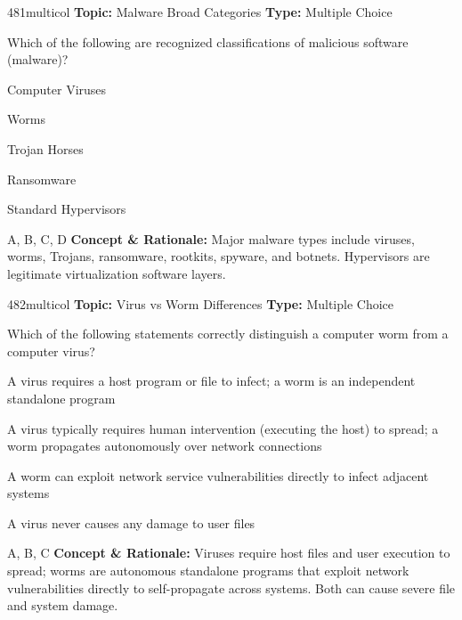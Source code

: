 \begin{qcard}{481}{multicol}
\textcolor{darkslate!75}{\small\textbf{Topic:} Malware Broad Categories \hfill \textbf{Type:} Multiple Choice}\vspace{0.4em}\par
Which of the following are recognized classifications of malicious software (malware)?
\begin{qoptions}
\item Computer Viruses
\item Worms
\item Trojan Horses
\item Ransomware
\item Standard Hypervisors
\end{qoptions}
\end{qcard}
\nopagebreak
\begin{explainbox}{A, B, C, D}
\textbf{Concept \& Rationale:} Major malware types include viruses, worms, Trojans, ransomware, rootkits, spyware, and botnets. Hypervisors are legitimate virtualization software layers.
\end{explainbox}

\begin{qcard}{482}{multicol}
\textcolor{darkslate!75}{\small\textbf{Topic:} Virus vs Worm Differences \hfill \textbf{Type:} Multiple Choice}\vspace{0.4em}\par
Which of the following statements correctly distinguish a computer worm from a computer virus?
\begin{qoptions}
\item A virus requires a host program or file to infect; a worm is an independent standalone program
\item A virus typically requires human intervention (executing the host) to spread; a worm propagates autonomously over network connections
\item A worm can exploit network service vulnerabilities directly to infect adjacent systems
\item A virus never causes any damage to user files
\end{qoptions}
\end{qcard}
\nopagebreak
\begin{explainbox}{A, B, C}
\textbf{Concept \& Rationale:} Viruses require host files and user execution to spread; worms are autonomous standalone programs that exploit network vulnerabilities directly to self-propagate across systems. Both can cause severe file and system damage.
\end{explainbox}


